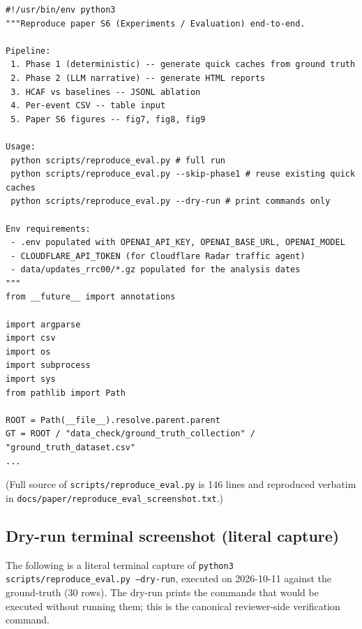 \documentclass[sigcomm,nonatbib]{acmart}
\begin{document}
\begin{verbatim}
#!/usr/bin/env python3
"""Reproduce paper S6 (Experiments / Evaluation) end-to-end.

Pipeline:
 1. Phase 1 (deterministic) -- generate quick caches from ground truth
 2. Phase 2 (LLM narrative) -- generate HTML reports
 3. HCAF vs baselines -- JSONL ablation
 4. Per-event CSV -- table input
 5. Paper S6 figures -- fig7, fig8, fig9

Usage:
 python scripts/reproduce_eval.py # full run
 python scripts/reproduce_eval.py --skip-phase1 # reuse existing quick caches
 python scripts/reproduce_eval.py --dry-run # print commands only

Env requirements:
 - .env populated with OPENAI_API_KEY, OPENAI_BASE_URL, OPENAI_MODEL
 - CLOUDFLARE_API_TOKEN (for Cloudflare Radar traffic agent)
 - data/updates_rrc00/*.gz populated for the analysis dates
"""
from __future__ import annotations

import argparse
import csv
import os
import subprocess
import sys
from pathlib import Path

ROOT = Path(__file__).resolve.parent.parent
GT = ROOT / "data_check/ground_truth_collection" / "ground_truth_dataset.csv"
...
\end{verbatim}

\noindent (Full source of \texttt{scripts/reproduce\_eval.py} is
146 lines and reproduced verbatim in
\texttt{docs/paper/reproduce\_eval\_screenshot.txt}.)

\subsection{Dry-run terminal screenshot (literal capture)}

\noindent The following is a literal terminal capture of
\texttt{python3 scripts/reproduce\_eval.py --dry-run}, executed on
2026-10-11 against the ground-truth (30 rows). The dry-run
prints the commands that would be executed without running them; this
is the canonical reviewer-side verification command.
\end{document}
